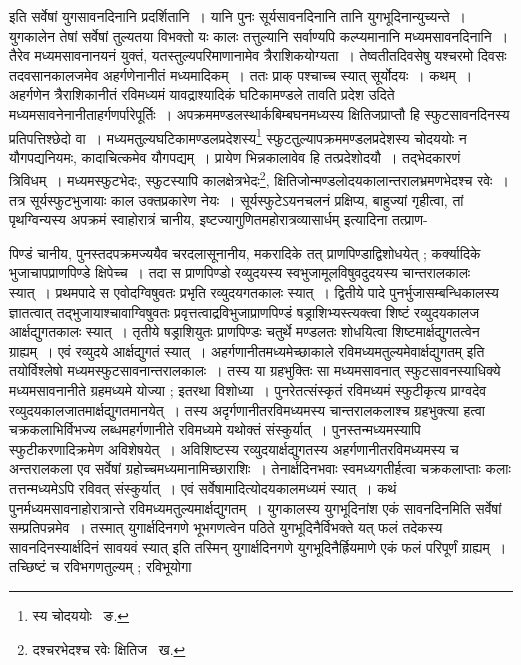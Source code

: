 \documentclass[11pt, openany]{book}
\begin{document}
\noindent इति सर्वेषां युगसावनदिनानि प्रदर्शितानि~। यानि पुनः सूर्यसावनदिनानि तानि युगभूदिनान्युच्यन्ते~। युगकालेन तेषां सर्वेषां तुल्यतया विभक्तो यः कालः तत्तुल्यानि सर्वाण्यपि कल्प्यमानानि मध्यमसावनदिनानि~। तैरेव मध्यमसावनानयनं युक्तं, यतस्तुल्यपरिमाणानामेव त्रैराशिकयोग्यता~। तेष्वतीतदिवसेषु यश्चरमो दिवसः तदवसानकालजमेव अहर्गणेनानीतं मध्यमादिकम्~। ततः प्राक् पश्चाच्च स्यात् सूर्योदयः~। कथम्~। अहर्गणेन त्रैराशिकानीतं रविमध्यमं यावद्राश्यादिकं घटिकामण्डले तावति प्रदेश उदिते मध्यमसावनेनानीताहर्गणर्पारेपूर्तिः~। अपक्रममण्डलस्थार्कबिम्बघनमध्यस्य क्षितिजप्राप्तौ हि स्फुटसावनदिनस्य प्रतिपत्तिश्छेदो वा~। मध्यमतुल्यघटिकामण्डलप्रदेशस्य\renewcommand{\thefootnote}{४}\footnote{स्य चोदययोः \textendash\ ङ.} स्फुटतुल्यापक्रममण्डलप्रदेशस्य चोदययोः न यौगपद्यनियमः, कादाचित्कमेव यौगपद्यम्~। प्रायेण भिन्नकालावेव हि तत्प्रदेशोदयौ~। तद्भेदकारणं त्रिविधम्~। मध्यमस्फुटभेदः, स्फुटस्यापि कालक्षेत्रभेदः\renewcommand{\thefootnote}{५}\footnote{दश्चरभेदश्च रवेः क्षितिज \textendash\ ख.},
क्षितिजोन्मण्डलोदयकालान्तरालभ्रमणभेदश्च रवेः~। तत्र सूर्यस्फुटभुजायाः काल उक्तप्रकारेण नेयः~। सूर्यस्फुटेऽयनचलनं प्रक्षिप्य, बाहुज्यां गृहीत्वा, तां पृथग्विन्यस्य अपक्रमं स्वाहोरात्रं चानीय, {\qt इष्टज्यागुणितमहोरात्रव्यासार्धम्} इत्यादिना तत्प्राण- 

\newpage

\noindent पिण्डं चानीय, पुनस्तदपक्रमज्ययैव चरदलासूनानीय, मकरादिके तत् प्राणपिण्डाद्विशोधयेत् ; कर्क्यादिके भुजाचापप्राणपिण्डे क्षिपेच्च~। तदा स प्राणपिण्डो रव्युदयस्य स्वभुजामूलविषुवदुदयस्य चान्तरालकालः स्यात्~। प्रथमपादे स एवोदग्विषुवतः प्रभृति रव्युदयगतकालः स्यात्~। द्वितीये पादे पुनर्भुजासम्बन्धिकालस्य ज्ञातत्वात् तद्भुजायाश्चावाग्विषुवतः प्रवृत्तत्वाद्रविभुजाप्राणपिण्डं षड्राशिभ्यस्त्यक्त्वा शिष्टं रव्युदयकालज आर्क्षद्युगतकालः स्यात्~। तृतीये षड्राशियुतः प्राणपिण्डः चतुर्थे मण्डलतः शोधयित्वा शिष्टमार्क्षद्युगतत्वेन ग्राह्यम्~। एवं रव्युदये आर्क्षद्युगतं स्यात्~। अहर्गणानीतमध्यमेच्छाकाले रविमध्यमतुल्यमेवार्क्षद्युगतम् इति तयोर्विश्लेषो मध्यमस्फुटसावनान्तरालकालः~। तस्य या ग्रहभुक्तिः सा मध्यमसावनात् स्फुटसावनस्याधिक्ये मध्यमसावनानीते ग्रहमध्यमे योज्या ; 
इतरथा विशोध्या~। पुनरेतत्संस्कृतं रविमध्यमं स्फुटीकृत्य प्राग्वदेव रव्युदयकालजातमार्क्षद्युगतमानयेत्~। तस्य अदृर्गणानीतरविमध्यमस्य
चान्तरालकलाश्च ग्रहभुक्त्या हत्वा चक्रकलाभिर्विभज्य लब्धमहर्गणानीते रविमध्यमे यथोक्तं संस्कुर्यात्~। पुनस्तन्मध्यमस्यापि स्फुटीकरणादिक्रमेण
अविशेषयेत्~। अविशिष्टस्य रव्युदयार्क्षद्युगतस्य अहर्गणानीतरविमध्यमस्य च अन्तरालकला एव सर्वेषां ग्रहोच्चमध्यमानामिच्छाराशिः~। तेनार्क्षदिनभवाः स्वमध्यगतीर्हत्वा चक्रकलाप्ताः कलाः तत्तन्मध्यमेऽपि रविवत् संस्कुर्यात्~। एवं सर्वेषामादित्योदयकालमध्यमं स्यात्~। कथं पुनर्मध्यमसावनाहोरात्रान्ते रविमध्यमतुल्यमार्क्षद्युगतम्~। युगकालस्य युगभूदिनांश एकं सावनदिनमिति सर्वेषां सम्प्रतिपन्नमेव~। तस्मात् युगार्क्षदिनगणे भूभगणत्वेन पठिते युगभूदिनैर्विभक्ते यत् फलं तदेकस्य सावनदिनस्यार्क्षदिनं सावयवं स्यात् इति तस्मिन् युगार्क्षदिनगणे युगभूदिनैर्ह्रियमाणे एकं फलं परिपूर्णं ग्राह्यम्~। तच्छिष्टं च रविभगणतुल्यम् ; {\qt रविभूयोगा} 
\end{document}
